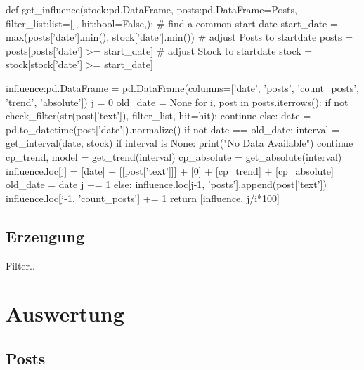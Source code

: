 \documentclass{article}
\begin{document}
\begin{python}
def get_influence(stock:pd.DataFrame, posts:pd.DataFrame=Posts, filter_list:list=[], hit:bool=False,):
    # find a common start date
    start_date = max(posts['date'].min(), stock['date'].min())
    # adjust Posts to startdate
    posts = posts[posts['date'] >= start_date]
    # adjust Stock to startdate
    stock = stock[stock['date'] >= start_date]

    influence:pd.DataFrame = pd.DataFrame(columns=['date', 'posts', 'count_posts', 'trend', 'absolute'])
    j = 0
    old_date = None
    for i, post in posts.iterrows():
        if not check_filter(str(post['text']), filter_list, hit=hit):
            continue
        else:
            date = pd.to_datetime(post['date']).normalize()
            if not date == old_date:
                interval = get_interval(date, stock)
                if interval is None:
                    print("No Data Available")
                    continue
                cp_trend, model = get_trend(interval)
                cp_absolute = get_absolute(interval)
                influence.loc[j] = [date] + [[post['text']]] + [0] + [cp_trend] + [cp_absolute]
                old_date = date
                j += 1
            else:
                influence.loc[j-1, 'posts'].append(post['text'])
                influence.loc[j-1, 'count_posts'] += 1
    return [influence, j/i*100]
\end{python}

\subsection{Erzeugung}
Filter..


\newpage

\section{Auswertung}
\subsection{Posts}
\end{document}
